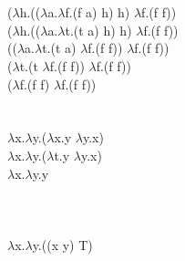 \documentclass[12pt]{article}
\begin{document}
\section{}
($\lambda$h.(($\lambda$a.$\lambda$f.(f a) h) h) $\lambda$f.(f f))\\
($\lambda$h.(($\lambda$a.$\lambda$t.(t a) h) h) $\lambda$f.(f f))\\
(($\lambda$a.$\lambda$t.(t a) $\lambda$f.(f f)) $\lambda$f.(f f))\\
($\lambda$t.(t $\lambda$f.(f f)) $\lambda$f.(f f))\\
($\lambda$f.(f f) $\lambda$f.(f f))\\

\section{}
$\lambda$x.$\lambda$y.($\lambda$x.y $\lambda$y.x)\\
$\lambda$x.$\lambda$y.($\lambda$t.y $\lambda$y.x)\\
$\lambda$x.$\lambda$y.y\\
\\
\section{}
$\lambda$x.$\lambda$y.((x y) T)
\end{document}
